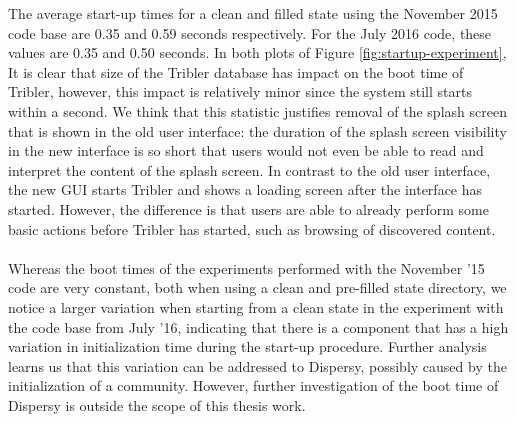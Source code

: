 \noindent The average start-up times for a clean and filled state using the November 2015 code base are 0.35 and 0.59 seconds respectively. For the July 2016 code, these values are 0.35 and 0.50 seconds. In both plots of Figure \ref{fig:startup-experiment}, It is clear that size of the Tribler database has impact on the boot time of Tribler, however, this impact is relatively minor since the system still starts within a second. We think that this statistic justifies removal of the splash screen that is shown in the old user interface: the duration of the splash screen visibility in the new interface is so short that users would not even be able to read and interpret the content of the splash screen. In contrast to the old user interface, the new GUI starts Tribler and shows a loading screen after the interface has started. However, the difference is that users are able to already perform some basic actions before Tribler has started, such as browsing of discovered content.\\\\
Whereas the boot times of the experiments performed with the November '15 code are very constant, both when using a clean and pre-filled state directory, we notice a larger variation when starting from a clean state in the experiment with the code base from July '16, indicating that there is a component that has a high variation in initialization time during the start-up procedure. Further analysis learns us that this variation can be addressed to Dispersy, possibly caused by the initialization of a community. However, further investigation of the boot time of Dispersy is outside the scope of this thesis work.

